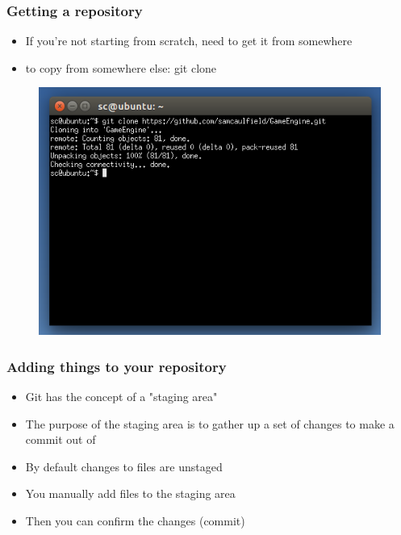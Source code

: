 \documentclass{beamer}
\begin{document}
\begin{frame}
\frametitle{Getting a repository}
\begin{itemize}
\item If you're not starting from scratch, need to get it from somewhere
\item to copy from somewhere else: git clone
\end{itemize}
\begin{figure}
\begin{center}
\includegraphics[scale=0.5]{gitclone}
\end{center}
\end{figure}
\end{frame}


\begin{frame}
\frametitle{Adding things to your repository}
\begin{itemize}
\item Git has the concept of a "staging area"
\item The purpose of the staging area is to gather up a set of changes to make a commit out of
\item By default changes to files are unstaged
\item You manually add files to the staging area
\item Then you can confirm the changes (commit)
\end{itemize}
\end{frame}
\end{document}
